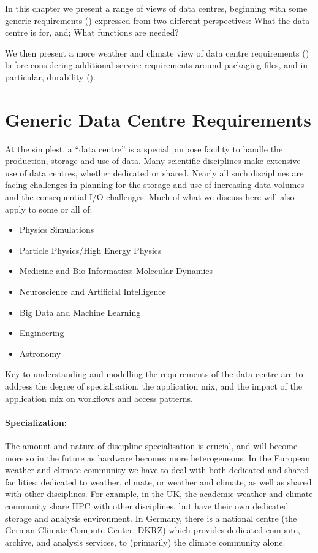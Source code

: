 \label{sec:dc_model}

In this chapter we present a range of views of data centres, beginning with some
generic requirements () expressed from two different perspectives: What the data centre is for, and; What
functions are needed?

We then present a more weather and climate view of data centre requirements
() before considering additional service requirements
around packaging files, and in particular, durability ().

\section{Generic Data Centre Requirements}
\label{sec:generic_dc}

At the simplest, a ``data centre'' is a special purpose facility to handle
the production, storage and use of data. Many scientific disciplines make
extensive use of data centres, whether dedicated or shared. Nearly all
such disciplines are facing challenges in planning for the storage and use of
increasing data volumes and the consequential I/O challenges. Much of
what we discuss here will also apply to some or all of:
\begin{itemize}
\item Physics Simulations
\item Particle Physics/High Energy Physics
\item Medicine and Bio-Informatics: Molecular Dynamics
\item Neuroscience and Artificial Intelligence
\item Big Data and Machine Learning
\item Engineering
\item Astronomy
\end{itemize}

Key to understanding and modelling the requirements of the data centre are
to address the degree of specialisation, the application mix, and the impact
of the application mix on workflows and access patterns.

\paragraph{Specialization:}
The amount and nature of discipline specialisation is crucial, and will become
more so in the future as hardware becomes more heterogeneous. In the European
weather and climate community we have to deal with both dedicated and shared
facilities: dedicated to weather, climate, or weather and climate, as well as
shared with other disciplines. For example, in the UK, the academic weather and
climate community share HPC with other disciplines, but have their own dedicated
storage and analysis environment. In Germany, there is a national centre (the
German Climate Compute Center, DKRZ) which provides dedicated compute,
archive, and analysis services, to (primarily) the climate community alone.

